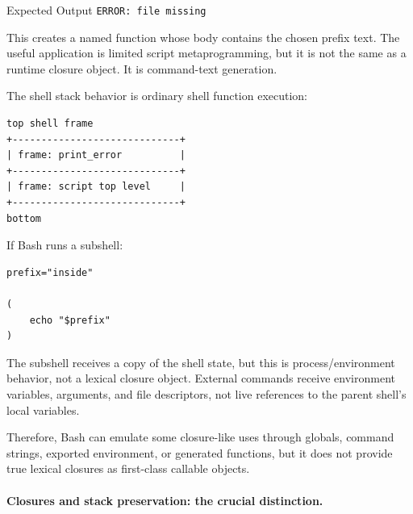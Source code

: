 \documentclass[a4paper,twoside]{report}
\begin{document}


\begin{iobox}{Expected Output}
\texttt{ERROR: file missing} \\
\end{iobox}



This creates a named function whose body contains the chosen prefix text. The useful application is limited script metaprogramming, but it is not the same as a runtime closure object. It is command-text generation.

The shell stack behavior is ordinary shell function execution:

\begin{verbatim}
top shell frame
+-----------------------------+
| frame: print_error          |
+-----------------------------+
| frame: script top level     |
+-----------------------------+
bottom
\end{verbatim}

If Bash runs a subshell:

\begin{verbatim}
prefix="inside"

(
    echo "$prefix"
)
\end{verbatim}

The subshell receives a copy of the shell state, but this is process/environment behavior, not a lexical closure object. External commands receive environment variables, arguments, and file descriptors, not live references to the parent shell's local variables.

Therefore, Bash can emulate some closure-like uses through globals, command strings, exported environment, or generated functions, but it does not provide true lexical closures as first-class callable objects.

\paragraph{Closures and stack preservation: the crucial distinction.}
\end{document}
